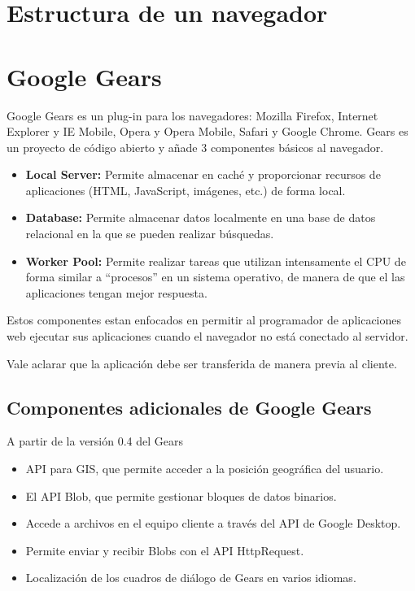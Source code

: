 \documentclass[a4paper]{report}
\begin{document}
\section{Estructura de un navegador}

\section{Google Gears}
Google Gears es un plug-in para los navegadores: Mozilla Firefox, Internet
Explorer y IE Mobile, Opera y Opera Mobile, Safari y Google Chrome. Gears es
un proyecto de código abierto y añade 3 componentes básicos al navegador.
\begin{itemize}
  \item {\textbf{Local Server:} Permite almacenar en caché y proporcionar
  recursos de aplicaciones (HTML, JavaScript, imágenes, etc.) de forma local. }
  \item {\textbf{Database:} Permite almacenar datos localmente en una base
  de datos relacional en la que se pueden realizar búsquedas. }
  \item { \textbf{Worker Pool:} Permite realizar tareas que utilizan
  intensamente el CPU de forma similar a ``procesos'' en un sistema operativo,
de manera de que el 
  las aplicaciones tengan mejor respuesta.}
\end{itemize}
Estos componentes estan enfocados en permitir al programador de aplicaciones web
ejecutar sus aplicaciones cuando el navegador no está conectado al servidor.

Vale aclarar que la aplicación debe ser transferida de manera previa al cliente.

\subsection{Componentes adicionales de Google Gears}
A partir de la versión 0.4 del Gears
\begin{itemize}
  \item{API para GIS, que permite acceder a la posición geográfica del usuario.}
  \item {El API Blob, que permite gestionar bloques de datos binarios.}
  \item {Accede a archivos en el equipo cliente a través del API de Google
  Desktop.}
  \item {Permite enviar y recibir Blobs con el API HttpRequest.}
  \item {Localización de los cuadros de diálogo de Gears en varios idiomas.}  
\end{itemize}
\end{document}
